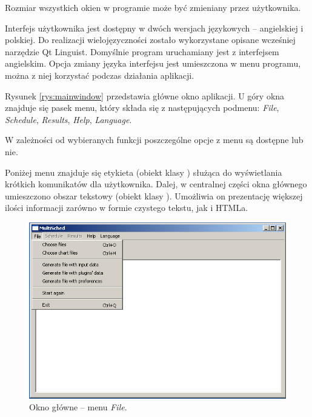 Rozmiar wszystkich okien w programie może być zmieniany przez użytkownika.

Interfejs użytkownika jest dostępny w dwóch wersjach językowych -- angielskiej i polskiej. Do realizacji wielojęzyczności zostało 
wykorzystane opisane wcześniej narzędzie Qt Linguist. Domyślnie program uruchamiany jest z interfejsem angielskim. Opcja zmiany języka 
interfejsu jest umieszczona w menu programu, można z niej korzystać podczas działania aplikacji.

Rysunek \vref{rys:mainwindow} przedstawia główne okno aplikacji. U góry okna znajduje się pasek menu, który składa się z następujących 
podmenu: \emph{File}, \emph{Schedule}, \emph{Results}, \emph{Help}, \emph{Language}. 

W zależności od wybieranych funkcji poszczególne opcje z menu są dostępne lub nie.

Poniżej menu znajduje się etykieta (obiekt klasy ) służąca do wyświetlania krótkich komunikatów dla użytkownika. Dalej, w centralnej części 
okna głównego umieszczono obszar tekstowy (obiekt klasy ). Umożliwia on prezentację większej ilości informacji zarówno w formie czystego 
tekstu, jak i HTMLa.

\begin{figure}[htp]
\centering\includegraphics[scale=0.8]{figures/screens/menu_file.png}
\caption{Okno główne -- menu \emph{File}.}\label{rys:mainwindow}
\end{figure}

